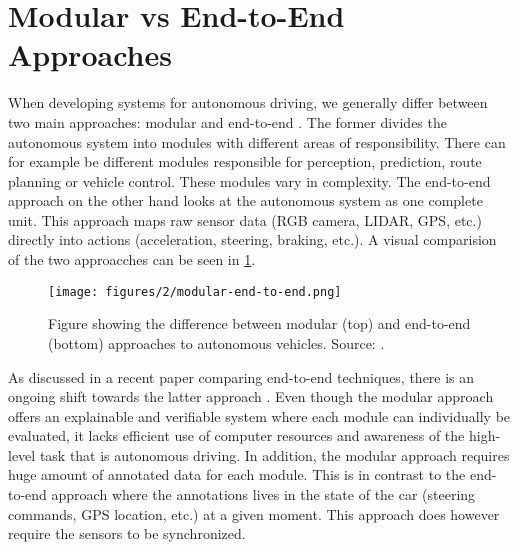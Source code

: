 \section{Modular vs End-to-End Approaches}

When developing systems for autonomous driving, we generally differ between two main approaches: modular and end-to-end \cite{multimodal-e2e-ad}. The former divides the autonomous system into modules with different areas of responsibility. There can for example be different modules responsible for perception, prediction, route planning or vehicle control. These modules vary in complexity. The end-to-end approach on the other hand looks at the autonomous system as one complete unit. This approach maps raw sensor data (RGB camera, LIDAR, GPS, etc.) directly into actions (acceleration, steering, braking, etc.). A visual comparision of the two approacches can be seen in \cref{fig:modular-vs-end-to-end}.

\begin{figure}[htbp]
    \centering
    \texttt{[image: figures/2/modular-end-to-end.png]}
    \caption{Figure showing the difference between modular (top) and end-to-end (bottom) approaches to autonomous vehicles. Source: \cite{computer-vision-for-autonomous-vehicles}.}
    \label{fig:modular-vs-end-to-end}
\end{figure}

As discussed in a recent paper comparing end-to-end techniques, there is an ongoing shift towards the latter approach \cite{survey-on-end-to-end-techniques}. Even though the modular approach offers an explainable and verifiable system where each module can individually be evaluated, it lacks efficient use of computer resources and awareness of the high-level task that is autonomous driving. In addition, the modular approach requires huge amount of annotated data for each module. This is in contrast to the end-to-end approach where the annotations lives in the state of the car (steering commands, GPS location, etc.) at a given moment. This approach does however require the sensors to be synchronized. 
